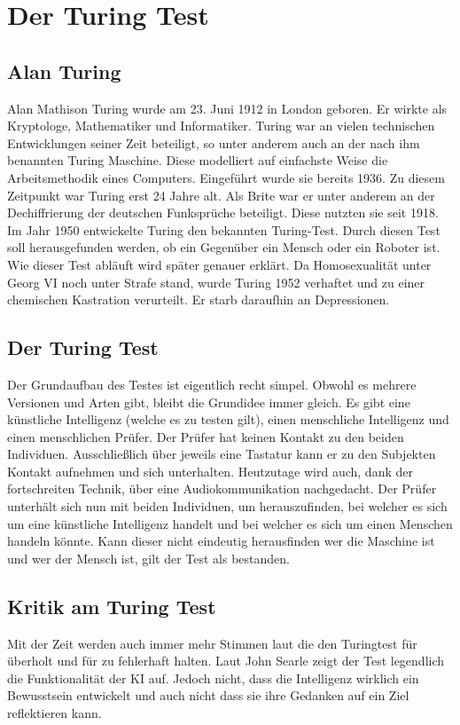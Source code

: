 \chapter{Der Turing Test}

\section{Alan Turing}
Alan Mathison Turing wurde am 23. Juni 1912 in London geboren. Er wirkte als Kryptologe, Mathematiker und Informatiker. Turing war an vielen technischen Entwicklungen seiner Zeit beteiligt, so unter anderem auch an der nach ihm benannten Turing Maschine. Diese modelliert auf einfachste Weise die Arbeitsmethodik eines Computers. Eingeführt wurde sie bereits 1936. Zu diesem Zeitpunkt war Turing erst 24 Jahre alt. Als Brite war er unter anderem an der Dechiffrierung der deutschen Funksprüche beteiligt. Diese nutzten sie seit 1918. Im Jahr 1950 entwickelte Turing den bekannten Turing-Test. Durch diesen Test soll herausgefunden werden, ob ein Gegenüber ein Mensch oder ein Roboter ist. Wie dieser Test abläuft wird später genauer erklärt. Da Homosexualität unter Georg VI noch unter Strafe stand, wurde Turing 1952 verhaftet und zu einer chemischen Kastration verurteilt. Er starb daraufhin an  Depressionen. ~\cite{Turing_Leben}

\section{Der Turing Test}
Der Grundaufbau des Testes ist eigentlich recht simpel. Obwohl es mehrere Versionen und Arten gibt, bleibt die Grundidee immer gleich. Es gibt eine künstliche Intelligenz (welche es zu testen gilt), einen menschliche Intelligenz und einen menschlichen Prüfer. Der Prüfer hat keinen Kontakt zu den beiden Individuen. Ausschließlich über jeweils eine Tastatur kann er zu den Subjekten Kontakt aufnehmen und sich unterhalten. Heutzutage wird auch, dank der fortschreiten Technik, über eine Audiokommunikation nachgedacht. Der Prüfer unterhält sich nun mit beiden Individuen, um herauszufinden, bei welcher es sich um eine künstliche Intelligenz handelt und bei welcher es sich um einen Menschen handeln könnte. Kann dieser nicht eindeutig herausfinden wer die Maschine ist und wer der Mensch ist, gilt der Test als bestanden. ~\cite{martinluescher2007}

\section{Kritik am Turing Test}
Mit der Zeit werden auch immer mehr Stimmen laut die den Turingtest für überholt und für zu fehlerhaft halten. Laut John Searle zeigt der Test legendlich die Funktionalität der KI auf. Jedoch nicht, dass die Intelligenz wirklich ein Bewusstsein entwickelt und auch nicht dass sie ihre Gedanken auf ein Ziel reflektieren kann. ~\cite{jaai2019}


